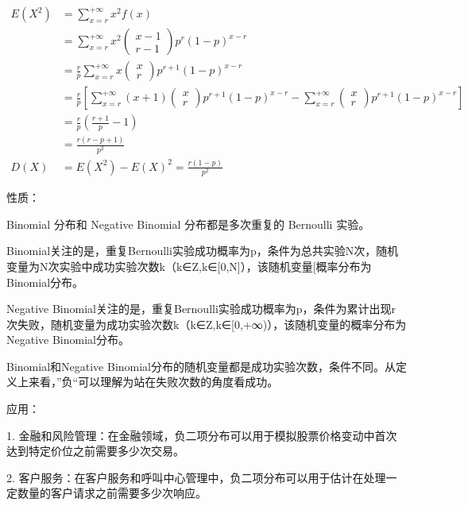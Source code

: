 \documentclass[12pt, a4paper, oneside]{ctexbook}
\begin{document}
$$
\begin{aligned}
E(X^{2}) &= \sum\limits_{x = r}^{+\infty} x^{2}f(x) \\
&= \sum\limits_{x = r}^{+\infty} x^{2} \begin{pmatrix}x - 1 \\ r-  1 \end{pmatrix}p^{r}(1 - p)^{x - r} \\
&= \frac{r}{p} \sum\limits_{x = r}^{+\infty} x\begin{pmatrix} x \\ r\end{pmatrix}p^{r + 1} (1 - p)^{x- r} \\
&= \frac{r}{p} \left[\sum\limits_{x = r}^{+\infty}(x + 1)\begin{pmatrix} x  \\ r\end{pmatrix} p^{r+ 1}(1 - p)^{x - r} - \sum\limits_{x = r}^{+\infty}\begin{pmatrix} x \\ r\end{pmatrix} p^{r+ 1}(1 - p)^{x - r}\right] \\
&= \frac{r}{p}(\frac{r + 1}{p} - 1) \\
&= \frac{r(r - p + 1)}{p^{2}} \\
D(X) &= E(X^{2}) - E(X)^{2} = \frac{r(1 - p)}{p^{2}}
\end{aligned}
$$





 性质：

Binomial 分布和 Negative Binomial 分布都是多次重复的 Bernoulli 实验。

Binomial关注的是，重复Bernoulli实验成功概率为p，条件为总共实验N次，随机变量为N次实验中成功实验次数k（k∈Z,k∈[0,N]），该随机变量[概率分布为Binomial分布。

Negative Binomial关注的是，重复Bernoulli实验成功概率为p，条件为累计出现r次失败，随机变量为成功实验次数k（k∈Z,k∈[0,+∞)），该随机变量的概率分布为Negative Binomial分布。

Binomial和Negative Binomial分布的随机变量都是成功实验次数，条件不同。从定义上来看，”负“可以理解为站在失败次数的角度看成功。

 应用：

1. 金融和风险管理：在金融领域，负二项分布可以用于模拟股票价格变动中首次达到特定价位之前需要多少次交易。

2. 客户服务：在客户服务和呼叫中心管理中，负二项分布可以用于估计在处理一定数量的客户请求之前需要多少次响应。
\end{document}
